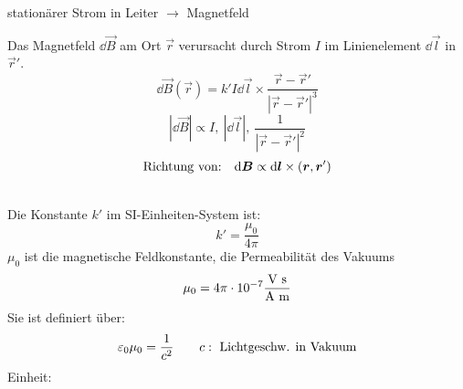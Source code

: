 stationärer Strom in Leiter $ \rightarrow $ Magnetfeld\\
\begin{minipage}{.7\linewidth}
	Das Magnetfeld $ \dd\vec{B} $ am Ort $ \vec{r} $ verursacht durch Strom $ I $ im Linienelement $ \dd \vec{l} $ in $ \vec{r}' $.
	\begin{equation*}
	\dd \vec{B}(\vec{r}) = k' I \dd \vec{l} \times \frac{\vec{r} - \vec{r}'}{|\vec{r} - \vec{r}'|^3}
	\end{equation*}
	\begin{equation*}
	|\dd \vec{B}| \propto I ,\  |\dd \vec{l}| ,\ \frac{1}{|\vec{r} - \vec{r}'|^2}
	\end{equation*}
	\begin{equation*}
	\textrm{Richtung von:} \quad \textrm{d} \bm{B} \propto \textrm{d}\bm{l} \times (\bm{r},\bm{r}')
	\end{equation*}
\end{minipage}%
\begin{minipage}{.3\linewidth}
	\centering
\end{minipage}%
\\
Die Konstante $ k' $ im SI-Einheiten-System ist:
\begin{equation*}
k' = \frac{\mu_0}{4 \pi}
\end{equation*}
$ \mu_0 $ ist die magnetische Feldkonstante, die Permeabilität des Vakuums
\begin{equation*}
\mu_0 = 4 \pi \cdot 10^{-7} \frac{\textrm{V s}}{\textrm{A m}}
\end{equation*}
Sie ist definiert über:
\begin{equation*}
\varepsilon_0 \mu_0 = \frac{1}{c^2} \qquad c: \textrm{ Lichtgeschw. in Vakuum}
\end{equation*}
Einheit:

